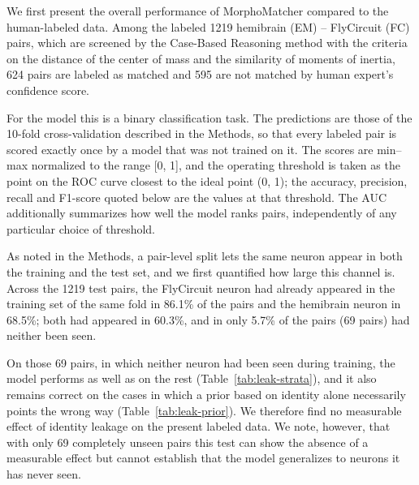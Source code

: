 \documentclass[10pt,a4paper]{article}
\begin{document}
We first present the overall performance of MorphoMatcher compared to the
human-labeled data. Among the labeled 1219 hemibrain (EM) -- FlyCircuit (FC) pairs, which are screened by
the Case-Based Reasoning method with the criteria on the distance of the center
of mass and the similarity of moments of inertia, 624 pairs are labeled as
matched and 595 are not matched by human expert's confidence score.

For the model this is a binary classification task. The predictions are those of
the 10-fold cross-validation described in the Methods, so that every labeled
pair is scored exactly once by a model that was not trained on it. The scores
are min--max normalized to the range [0, 1], and the operating threshold is
taken as the point on the ROC curve closest to the ideal point (0, 1); the
accuracy, precision, recall and F1-score quoted below are the values at that
threshold. The AUC additionally summarizes how well the model ranks pairs,
independently of any particular choice of threshold.


As noted in the Methods, a pair-level split lets the same neuron appear in both
the training and the test set, and we first quantified how large this channel
is. Across the 1219 test pairs, the FlyCircuit neuron had already appeared in
the training set of the same fold in 86.1\% of the pairs and the hemibrain
neuron in 68.5\%; both had appeared in 60.3\%, and in only 5.7\% of the pairs
(69 pairs) had neither been seen.

On those 69 pairs, in which neither neuron had been seen during training, the
model performs as well as on the rest (Table~\ref{tab:leak-strata}), and it also
remains correct on the cases in which a prior based on identity alone
necessarily points the wrong way (Table~\ref{tab:leak-prior}). We therefore find
no measurable effect of identity leakage on the present labeled data. We note,
however, that with only 69 completely unseen pairs this test can show the
absence of a measurable effect but cannot establish that the model generalizes
to neurons it has never seen.
\end{document}
